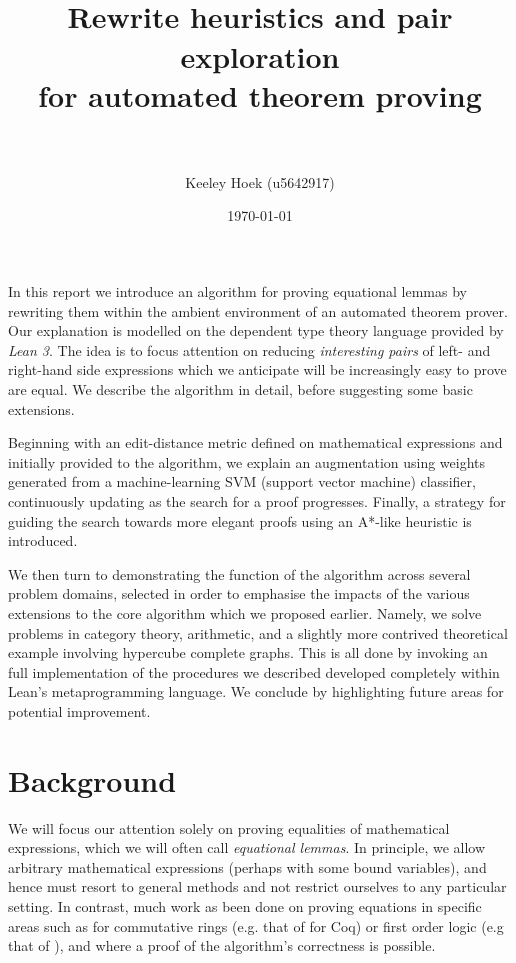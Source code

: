 \documentclass[a4paper]{article}
\title{\normalfont{}
\vspace{-3cm}
    \horrule{0.5pt} \\[0.4cm]
    \huge Rewrite heuristics and pair exploration \\[0.1cm]
    \LARGE for automated theorem proving \\
    \horrule{2pt} \\[0.5cm]
}
\author{Keeley Hoek (u5642917)}
\date{\normalsize \today}
\theoremstyle{plain}
\theoremstyle{definition}
\begin{document}
\maketitle

\noindent

In this report we introduce an algorithm for proving equational lemmas by rewriting them within the ambient environment of an automated theorem prover. Our explanation is modelled on the dependent type theory language provided by \textit{Lean 3}. The idea is to focus attention on reducing \textit{interesting pairs} of left- and right-hand side expressions which we anticipate will be increasingly easy to prove are equal. We describe the algorithm in detail, before suggesting some basic extensions.

Beginning with an edit-distance metric defined on mathematical expressions and initially provided to the algorithm, we explain an augmentation using weights generated from a machine-learning SVM (support vector machine) classifier, continuously updating as the search for a proof progresses. Finally, a strategy for guiding the search towards more elegant proofs using an A*-like heuristic is introduced.

We then turn to demonstrating the function of the algorithm across several problem domains, selected in order to emphasise the impacts of the various extensions to the core algorithm which we proposed earlier. Namely, we solve problems in category theory, arithmetic, and a slightly more contrived theoretical example involving hypercube complete graphs. This is all done by invoking an full implementation of the procedures we described developed completely within Lean's metaprogramming language. We conclude by highlighting future areas for potential improvement.

\section{Background}

We will focus our attention solely on proving equalities of mathematical expressions, which we will often call \textit{equational lemmas}. In principle, we allow arbitrary mathematical expressions (perhaps with some bound variables), and hence must resort to general methods and not restrict ourselves to any particular setting. In contrast, much work as been done on proving equations in specific areas such as for commutative rings (e.g. that of \parencite{gregoire2005proving} for Coq) or first order logic (e.g that of \parencite{bachmair1994rewrite}), and where a proof of the algorithm's correctness is possible.
\end{document}

